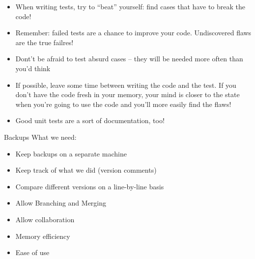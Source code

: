 
\begin{frame}
%
\begin{hintbox}
\begin{itemize}
\item When writing tests, try to \enquote{beat} yourself: find cases that have to break the code!
\item Remember: failed tests are a chance to improve your code. Undiscovered flaws are the true failres!
\item Dont't be afraid to test absurd cases -- they will be needed more often than you'd think
\item If possible, leave some time between writing the code and the test.
	If you don't have the code fresh in your memory, your mind is closer to the state when you're going to use the code and you'll more easily find the flaws!
\item Good unit tests are a sort of documentation, too!
\end{itemize}
\end{hintbox}
%
\end{frame}


\begin{frame}{Backups}
%
What we need:
\begin{itemize}
\item Keep backups on a separate machine
\item Keep track of what we did (version comments)
\item Compare different versions on a line-by-line basis
\item Allow Branching and Merging
\item Allow collaboration
\item Memory efficiency
\item Ease of use
\end{itemize}
%
\end{frame}


